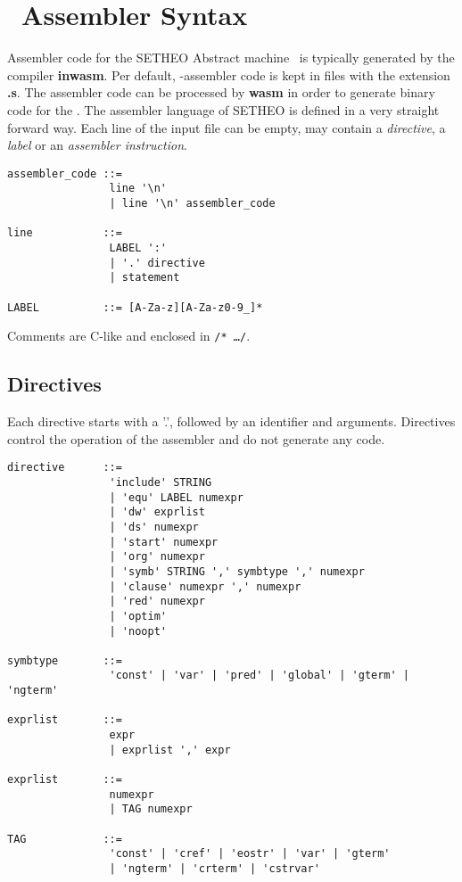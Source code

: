 %

\section{\SAM\ Assembler Syntax}
\label{sec:s-syntax}

Assembler code for the SETHEO Abstract machine \SAM\ is typically
generated by the compiler {\bf inwasm}. Per default, \SAM-assembler
code is kept in files with the extension {\bf .s}. The assembler code
can be processed by {\bf wasm} in order to generate binary code for the
\SAM.
The assembler language of SETHEO is defined in a very straight forward
way. Each line of the input file can be empty, may contain
a {\em directive\/}, a {\em label} or an {\em assembler instruction}.

\begin{verbatim}
assembler_code ::=
                line '\n'
                | line '\n' assembler_code

line           ::= 
                LABEL ':' 
                | '.' directive
                | statement 

LABEL          ::= [A-Za-z][A-Za-z0-9_]*
\end{verbatim}

Comments are C-like and enclosed in {\tt /* \ldots */}.

\subsection{Directives}
Each directive starts with a '.', followed by an identifier and
arguments. Directives control the operation of the assembler and do
not generate any code.

\begin{verbatim}
directive      ::=
                'include' STRING
                | 'equ' LABEL numexpr
                | 'dw' exprlist
                | 'ds' numexpr
                | 'start' numexpr
                | 'org' numexpr
                | 'symb' STRING ',' symbtype ',' numexpr
                | 'clause' numexpr ',' numexpr
                | 'red' numexpr
                | 'optim'
                | 'noopt'

symbtype       ::=
                'const' | 'var' | 'pred' | 'global' | 'gterm' | 'ngterm'

exprlist       ::=
                expr
                | exprlist ',' expr

exprlist       ::=
                numexpr
                | TAG numexpr

TAG            ::=
                'const' | 'cref' | 'eostr' | 'var' | 'gterm'
                | 'ngterm' | 'crterm' | 'cstrvar'
\end{verbatim}

